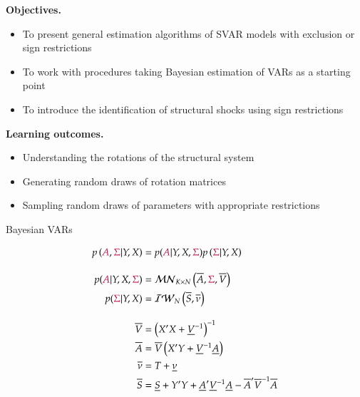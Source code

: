 \documentclass[notes,blackandwhite,mathsans,usenames,dvipsnames]{beamer}
\begin{document}
{
\begin{frame}

\bigskip\textbf{\color{mcxs1}Objectives.}
\begin{itemize}[label=$\blacktriangleright$]
\item {\color{mcxs1}To present general estimation algorithms of SVAR models with exclusion or sign restrictions}
\item {\color{mcxs1}To work with procedures taking Bayesian estimation of VARs as a starting point}
\item {\color{mcxs1}To introduce the identification of structural shocks using sign restrictions}
\end{itemize}

\bigskip\textbf{\color{mcxs2}Learning outcomes.}
\begin{itemize}[label=$\blacktriangleright$]
\item {\color{mcxs2}Understanding the rotations of the structural system}
\item {\color{mcxs2}Generating random draws of rotation matrices}
\item {\color{mcxs2}Sampling random draws of parameters with appropriate restrictions}
\end{itemize}

\end{frame}
}






\begin{frame}{Bayesian VARs}

\begin{align*} 
p\left( {\color{purple}A}, {\color{purple}\Sigma}|Y,X \right) &= p({\color{purple}A}|Y,X,{\color{purple}\Sigma})p\left( {\color{purple}\Sigma}|Y,X \right)\\[2ex]
p({\color{purple}A}|Y,X,{\color{purple}\Sigma}) &= \mathcal{MN}_{K\times N}\left( \overline{A},{\color{purple}\Sigma},\overline{V} \right)\\
p({\color{purple}\Sigma}|Y,X) &= \mathcal{IW}_N\left( \overline{S}, \overline{\nu} \right)\\[2ex]
\overline{V}&= \left( X'X + \underline{V}^{-1}\right)^{-1} \\
\overline{A}&= \overline{V}\left( X'Y + \underline{V}^{-1}\underline{A} \right)\\
\overline{\nu}&= T+\underline{\nu}\\
\overline{S}&= \underline{S}+Y'Y + \underline{A}'\underline{V}^{-1}\underline{A} - \overline{A}'\overline{V}^{-1}\overline{A}
\end{align*} 

\end{frame}
\end{document}
